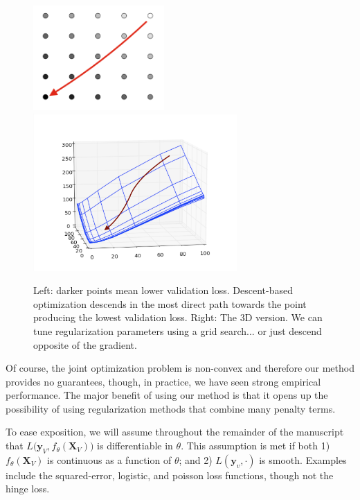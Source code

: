 \documentclass[10pt,letterpaper]{article}
\begin{document}
\begin{figure}
\begin{center}
\includegraphics[height=40mm]{grid_search_vs_descent.png}
\includegraphics[height=60mm]{surface_in_regularization_parameters.png}
\end{center}
\caption{Left: darker points mean lower validation loss. Descent-based optimization descends in the most direct path towards the point producing the lowest validation loss. Right: The 3D version. We can tune regularization parameters using a grid search... or just descend opposite of the gradient.}
\label{fig:compare}
\end{figure}

Of course, the joint optimization problem is non-convex and therefore our method provides no guarantees, though, in practice, we have seen strong empirical performance. The major benefit of using our method is that it opens up the possibility of using regularization methods that combine many penalty terms.

To ease exposition, we will assume throughout the remainder of the manuscript that $L \Big( \boldsymbol{y}_V, f_{\theta}(\boldsymbol{X}_V)\Big)$ is differentiable in $\theta$. This assumption is met if both 1) $f_{\theta}(\boldsymbol{X}_V)$ is continuous as a function of $\theta$; and 2) $L\left(\boldsymbol{y}_v,\cdot\right)$ is smooth. Examples include the squared-error, logistic, and poisson loss functions, though not the hinge loss.
\end{document}
